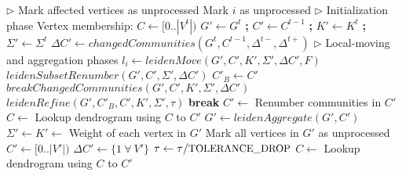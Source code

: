 \begin{algorithm}[hbtp]
\begin{algorithmic}[1]
 \label{alg:leiden--begin}
  \State $\rhd$ Mark affected vertices as unprocessed
   \label{alg:leiden--mark-begin}
     Mark $i$ as unprocessed
    \EndIf
  \EndFor \label{alg:leiden--mark-end}
  \State $\rhd$ Initialization phase
  \State Vertex membership: $C \gets [0 .. |V^t|)$ \label{alg:leiden--init-begin}
  \State $G' \gets G^t$ \textbf{;} $C' \gets C^{t-1}$ \textbf{;} $K' \gets K^t$ \textbf{;} $\Sigma' \gets \Sigma^t$
  \State $\Delta C' \gets changedCommunities(G^t, C^{t-1}, \Delta^{t-}, \Delta^{t+})$ \label{alg:leiden--init-end}
  \State $\rhd$ Local-moving and aggregation phases
  \ForAll{$l_p \in [0 .. \text{\small{MAX\_PASSES}})$} \label{alg:leiden--passes-begin}
    \State $l_i \gets leidenMove(G', C', K', \Sigma', \Delta C', F)$  \label{alg:leiden--local-move}
    \State $leidenSubsetRenumber(G', C', \Sigma', \Delta C')$  \label{alg:leiden-subset-renumber}
    \State $C'_B \gets C'$ 
    \State $breakChangedCommunities(G', C', K', \Sigma', \Delta C')$ \label{alg:leiden--reset-again}
    \State $leidenRefine(G', C'_B, C', K', \Sigma', \tau)$  \label{alg:leiden--refine}
     \textbf{break}  \label{alg:leiden--globally-converged}
    \EndIf
    \State $C' \gets$ Renumber communities in $C'$ \label{alg:leiden--renumber}
    \State $C \gets$ Lookup dendrogram using $C$ to $C'$ \label{alg:leiden--lookup}
    \State $G' \gets leidenAggregate(G', C')$  \label{alg:leiden--aggregate}
    \State $\Sigma' \gets K' \gets$ Weight of each vertex in $G'$ \label{alg:leiden--reset-weights}
    \State Mark all vertices in $G'$ as unprocessed \label{alg:leiden--reset-affected}
    \State $C' \gets [0 .. |V'|)$  \label{alg:leiden--useparent}
    \State $\Delta C' \gets \{1\ \forall\ V'\}$  \label{alg:leiden--all-communities-changed}
    \State $\tau \gets \tau / \text{\small{TOLERANCE\_DROP}}$  \label{alg:leiden--threshold-scaling}
  \EndFor \label{alg:leiden--passes-end}
  \State $C \gets$ Lookup dendrogram using $C$ to $C'$ \label{alg:leiden--lookup-last}
   \label{alg:leiden--return}
\EndFunction \label{alg:leiden--end}


\end{algorithmic}
\end{algorithm}
